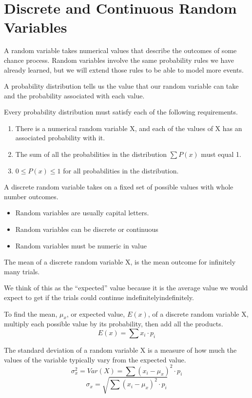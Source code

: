 \documentclass[../stats.tex]{subfiles}
\begin{document}
\section{Discrete and Continuous Random Variables}
A random variable takes numerical values that describe the outcomes of some chance process. Random variables involve the same probability rules 
we have already learned, but we will extend those rules to be able to model more events.

A probability distribution tells us the value that our random variable can take and the probability associated with each value.

Every probability distribution must satisfy each of the following requirements.
\begin{enumerate}
    \item There is a numerical random variable X, and each of the values of X has an associated probability with it.
    \item The sum of all the probabilities in the distribution $\sum P(x)$ must equal 1.
    \item $0\leq P(x)\leq 1$ for all probabilities in the distribution.
\end{enumerate}

A discrete random variable takes on a fixed set of possible values with whole number outcomes.
\begin{itemize}
    \item Random variables are usually capital letters.
    \item Random variables can be discrete or continuous 
    \item Random variables must be numeric in value 
\end{itemize}
The mean of a discrete random variable X, is the mean outcome for infinitely many trials.

We think of this as the ``expected'' value because it is the average value we would expect to get if the trials could continue indefinitelyindefinitely.

To find the mean, $\mu_x$, or expected value, $E(x)$, of a discrete random variable X, multiply each possible value by its probability, then add all the products.
\[E(x)=\sum x_i\cdot p_i\]

The standard deviation of a random variable X is a measure of how much the values of the variable typically vary from the expected value.
\[\sigma_x^2 = Var(X)=\sum(x_i-\mu_x)^2\cdot p_i\]
\[\sigma_x = \sqrt{\sum(x_i-\mu_x)^2\cdot p_i}\]
\end{document}
